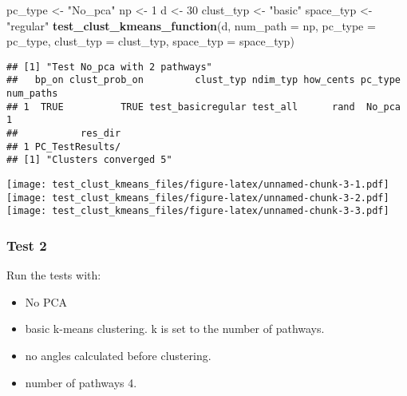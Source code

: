 \documentclass[
]{article}
\newenvironment{Shaded}{\begin{snugshade}}{\end{snugshade}}
\newcommand{\AttributeTok}[1]{\textcolor[rgb]{0.13,0.29,0.53}{#1}}
\newcommand{\DecValTok}[1]{\textcolor[rgb]{0.00,0.00,0.81}{#1}}
\newcommand{\FunctionTok}[1]{\textcolor[rgb]{0.13,0.29,0.53}{\textbf{#1}}}
\newcommand{\NormalTok}[1]{#1}
\newcommand{\OtherTok}[1]{\textcolor[rgb]{0.56,0.35,0.01}{#1}}
\newcommand{\StringTok}[1]{\textcolor[rgb]{0.31,0.60,0.02}{#1}}
\providecommand{\tightlist}{%
  \setlength{\itemsep}{0pt}\setlength{\parskip}{0pt}}
\begin{document}
\begin{Shaded}
\begin{Highlighting}[]
\NormalTok{pc\_type }\OtherTok{\textless{}{-}} \StringTok{"No\_pca"}
\NormalTok{np }\OtherTok{\textless{}{-}} \DecValTok{1}
\NormalTok{d }\OtherTok{\textless{}{-}} \DecValTok{30}
\NormalTok{clust\_typ }\OtherTok{\textless{}{-}} \StringTok{"basic"}
\NormalTok{space\_typ }\OtherTok{\textless{}{-}} \StringTok{"regular"}
\FunctionTok{test\_clust\_kmeans\_function}\NormalTok{(d,}
                           \AttributeTok{num\_path =}\NormalTok{ np,}
                           \AttributeTok{pc\_type =}\NormalTok{ pc\_type,}
                           \AttributeTok{clust\_typ =}\NormalTok{ clust\_typ,}
                           \AttributeTok{space\_typ =}\NormalTok{ space\_typ)}
\end{Highlighting}
\end{Shaded}

\begin{verbatim}
## [1] "Test No_pca with 2 pathways"
##   bp_on clust_prob_on         clust_typ ndim_typ how_cents pc_type num_paths
## 1  TRUE          TRUE test_basicregular test_all      rand  No_pca         1
##           res_dir
## 1 PC_TestResults/
## [1] "Clusters converged 5"
\end{verbatim}

\texttt{[image: test\_clust\_kmeans\_files/figure-latex/unnamed-chunk-3-1.pdf]}
\texttt{[image: test\_clust\_kmeans\_files/figure-latex/unnamed-chunk-3-2.pdf]}
\texttt{[image: test\_clust\_kmeans\_files/figure-latex/unnamed-chunk-3-3.pdf]}

\hypertarget{test-2}{%
\subsubsection{Test 2}\label{test-2}}

Run the tests with:

\begin{itemize}
\tightlist
\item
  No PCA
\item
  basic k-means clustering. k is set to the number of pathways.
\item
  no angles calculated before clustering.
\item
  number of pathways 4.
\end{itemize}
\end{document}
